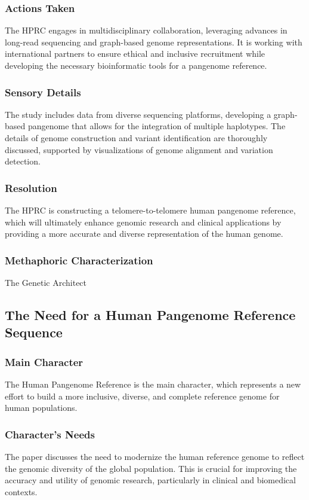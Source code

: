 \subsubsection{Actions Taken}
The HPRC engages in multidisciplinary collaboration, leveraging advances in long-read sequencing and graph-based genome representations. It is working with international partners to ensure ethical and inclusive recruitment while developing the necessary bioinformatic tools for a pangenome reference.

\subsubsection{Sensory Details}
The study includes data from diverse sequencing platforms, developing a graph-based pangenome that allows for the integration of multiple haplotypes. The details of genome construction and variant identification are thoroughly discussed, supported by visualizations of genome alignment and variation detection.

\subsubsection{Resolution}
The HPRC is constructing a telomere-to-telomere human pangenome reference, which will ultimately enhance genomic research and clinical applications by providing a more accurate and diverse representation of the human genome.

\subsubsection{Methaphoric Characterization}
The Genetic Architect


\subsection{The Need for a Human Pangenome Reference Sequence}
\subsubsection{Main Character}
The Human Pangenome Reference is the main character, which represents a new effort to build a more inclusive, diverse, and complete reference genome for human populations.

\subsubsection{Character's Needs}
The paper discusses the need to modernize the human reference genome to reflect the genomic diversity of the global population. This is crucial for improving the accuracy and utility of genomic research, particularly in clinical and biomedical contexts.


